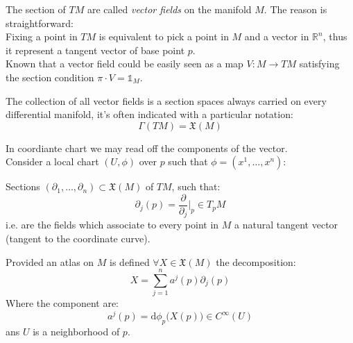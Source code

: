 \documentclass[a4paper,12pt]{scrartcl}    %
\begin{document}
\begin{notationfix}
The section of $TM$ are called \emph{vector fields} on the manifold $M$.
The reason is straightforward:
\\ Fixing a point in $TM$ is equivalent to pick a point in $M$ and a vector in $\mathbb{R}^n$, thus it represent a tangent vector of base point $p$.
\\ Known that a vector field could be easily seen as a map $V:M \rightarrow TM$ satisfying the section condition $ \pi \cdot V = \mathbb{1}_M$.
\end{notationfix}

\begin{notationfix}
The collection of all vector fields is a section spaces always carried on every differential manifold, it's often indicated with a particular notation:
	\begin{displaymath}
	 \Gamma(TM) = \mathfrak{X}(M)
	\end{displaymath}
\end{notationfix}	

In coordiante chart we may read off the components of the vector.
\\Consider a local chart $(U, \phi)$ over $p$ such that $\phi=(x^1, \ldots, x^n )$:

\begin{definition}
Sections  $(\partial_1, \ldots, \partial_n) \subset \mathfrak{X}(M)$ of $TM$, such that:
	\begin{displaymath}
		\partial_j (p) = \frac{\partial}{\partial_j} \big \vert_p \in T_pM
	\end{displaymath}
i.e. are the fields which associate to every point in $M$ a natural tangent vector (tangent to the coordinate curve).
\end{definition}

\begin{observation}
Provided an atlas on $M$ is defined $\forall X \in \mathfrak{X}(M)$ the decomposition:
	\begin{displaymath}
		X= \sum_{j=1}^n a^j(p) \partial_j(p)
	\end{displaymath}
Where the component are:
	\begin{equation}\label{eq: vector fields components}
		a^j(p) = \textrm{d}\phi_p \big( X(p)\big) \in C^\infty(U)
	\end{equation}
ans $U$ is a neighborhood of $p$.
\end{observation}
\end{document}
